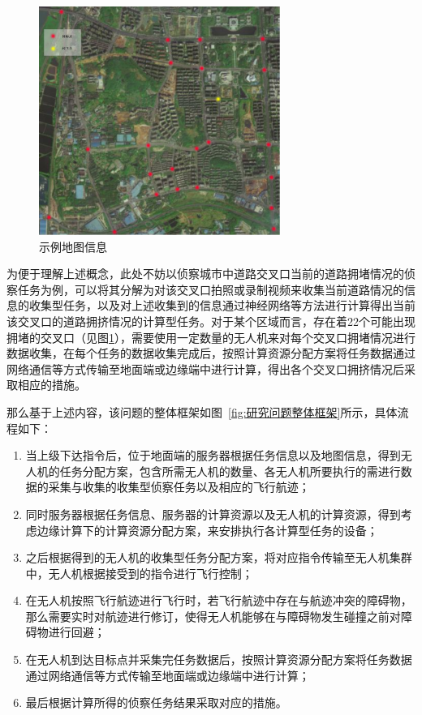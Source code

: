 \begin{figure}[!htbp]
    \centering
    \includegraphics[width=0.7\textwidth]{./images/示例地图}
    \caption{示例地图信息}
    \label{fig:示例地图信息}
\end{figure}

为便于理解上述概念，此处不妨以侦察城市中道路交叉口当前的道路拥堵情况的侦察任务为例，可以将其分解为对该交叉口拍照或录制视频来收集当前道路情况的信息的收集型任务，以及对上述收集到的信息通过神经网络等方法进行计算得出当前该交叉口的道路拥挤情况的计算型任务。对于某个区域而言，存在着22个可能出现拥堵的交叉口（见图\ref{fig:示例地图信息}），需要使用一定数量的无人机来对每个交叉口拥堵情况进行数据收集，在每个任务的数据收集完成后，按照计算资源分配方案将任务数据通过网络通信等方式传输至地面端或边缘端中进行计算，得出各个交叉口拥挤情况后采取相应的措施。

那么基于上述内容，该问题的整体框架如图~\ref{fig:研究问题整体框架}所示，具体流程如下：

\begin{enumerate}[label=(\arabic*)]
    \item {当上级下达指令后，位于地面端的服务器根据任务信息以及地图信息，得到无人机的任务分配方案，包含所需无人机的数量、各无人机所要执行的需进行数据的采集与收集的收集型侦察任务以及相应的飞行航迹；}

    \item {同时服务器根据任务信息、服务器的计算资源以及无人机的计算资源，得到考虑边缘计算下的计算资源分配方案，来安排执行各计算型任务的设备；}

    \item {之后根据得到的无人机的收集型任务分配方案，将对应指令传输至无人机集群中，无人机根据接受到的指令进行飞行控制；}

    \item {在无人机按照飞行航迹进行飞行时，若飞行航迹中存在与航迹冲突的障碍物，那么需要实时对航迹进行修订，使得无人机能够在与障碍物发生碰撞之前对障碍物进行回避；}

    \item {在无人机到达目标点并采集完任务数据后，按照计算资源分配方案将任务数据通过网络通信等方式传输至地面端或边缘端中进行计算；}

    \item {最后根据计算所得的侦察任务结果采取对应的措施。}
\end{enumerate}

